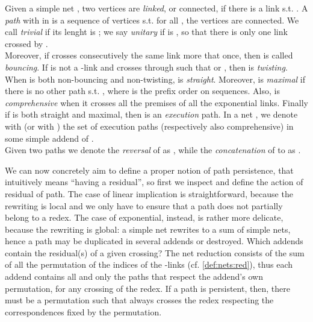 \begin{definition}[Path] \label{def:path}
  Given a simple net , two vertices  are \textit{linked}, 
  or connected, if there is a link  s.t.  .
  A \textit{path}  with  in 
  is a sequence of vertices s.t.
    for all ,
    the vertices  are connected.
  We call  \textit{trivial} if its lenght is ; 
  we say  \textit{unitary} if is , so that there is only one link
  crossed by .
  \\
  Moreover, if  crosses consecutively the same link  more that once, 
  then  is called \textit{bouncing}.
  If  is not a -link and  crosses  through  such that
     or ,
  then  is \textit{twisting}.
  When  is both non-bouncing and non-twisting,  is \textit{straight}.
  Moreover,  is \textit{maximal} if there is no other path
   s.t. , where  is the 
  prefix order on sequences.
  Also,  is \textit{comprehensive} when it crosses all the premises of all 
  the exponential links.
  Finally if  is both straight and maximal, then  is an 
  \textit{execution} path.
  In a net , we denote with 
  (or with ) 
  the set of execution paths (respectively also comprehensive)
  in some simple  addend of .
  \\
  Given two paths 
  we denote the \textit{reversal} of  as ,
  while the \textit{concatenation} of  to  as .
\end{definition}

We can now concretely aim to define a proper notion of path persistence, that 
intuitively means ``having a residual'', so first we inspect and define the 
action of residual of path.
The case of linear implication is straightforward, because the rewriting is 
local and we only have to ensure that a path does not partially belong to 
a redex.
The case of exponential, instead, is rather more delicate, because the 
rewriting is global: a simple net rewrites to a sum of simple nets, hence a 
path may be duplicated in several addends or destroyed.
Which addends contain the residual(s) of a given crossing?
The net reduction consists of the sum of all the permutation of the indices of 
the -links (cf. \autoref{def:nets:red}), thus each addend contains all 
and only the paths that respect the addend's own permutation, for any crossing 
of the redex.
If a path  is persistent, then, there must be a permutation such that 
 always crosses the redex respecting the correspondences fixed by the 
permutation.



